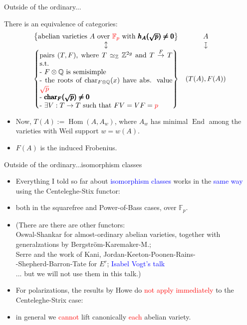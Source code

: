 \documentclass[usenames,dvipsnames,handout]{beamer}
\def\Q{\mathbb{Q}}
\def\Z{\mathbb{Z}}
\def\F{\mathbb{F}}
\DeclareMathOperator{\Char}{char}
\DeclareMathOperator{\Hom}{Hom}
\DeclareMathOperator{\End}{End}
\newcommand{\downmapsto}{\rotatebox[origin=c]{-90}{$\large\mapsto$}\mkern2mu} %
\newcommand{\set}[1]{\left\lbrace#1\right\rbrace }
\newcommand{\red}[1]{\textcolor{red}{#1}}
\newcommand{\blue}[1]{\textcolor{blue}{#1}}
\begin{document}
\begin{frame}{ Outside of the ordinary... }
\pause
	\begin{theorem}
	There is an equivalence of categories:
	\[ \begin{array}{cc}
	\set{\text{abelian varieties $A$ over \red{$\F_p$} with $\pmb{h_A(\sqrt{p})\neq 0}$}} 	& A \\
    \updownarrow											& \downmapsto \\
	\set{\parbox[p]{19em}{pairs $(T,F)$, where $T\simeq_\Z \Z^{2g}$ and $T\overset{F}{\to} T$ s.t.\\
	- $F\otimes \Q$ is semisimple\\
	- the roots of $\Char_{F\otimes\Q}(x)$ have abs. value \red{$\sqrt{p}$}\\
	- $\pmb{\Char_{F}(\sqrt{p})\neq 0}$\\
	- $\exists V:T\to T$ such that $FV=VF=\red{p}$
	}}	& (T(A),F(A))
	\end{array} \]
	\end{theorem}
\pause
	\begin{itemize}
	 \item Now, $T(A):=\Hom(A,A_w)$, where $A_w$ has minimal $\End$ among the varieties with Weil support $w=w(A)$.
	 \item $F(A)$ is the induced Frobenius.
	\end{itemize}
\end{frame}

\begin{frame}{ Outside of the ordinary...isomorphism classes } 
\begin{itemize}
    \item Everything I told so far about \blue{isomorphism classes} works in the \blue{same way} using the Centeleghe-Stix functor:
    \item both in the squarefree and Power-of-Bass cases, over $\F_p$.
\pause
    \item (There are there are other functors:\\
\pause
          Oswal-Shankar for almost-ordinary abelian varieties, together with generalzations by Bergstr\"om-Karemaker-M.;\\
\pause          
          Serre and the work of Kani, Jordan-Keeton-Poonen-Rains-\\-Shepherd-Barron-Tate for $E^r$; \blue{Isabel Vogt's talk}\\
\pause
    ... but we will not use them in this talk.)
\pause
    \item For polarizations, the results by Howe do \red{not apply immediately} to the Centeleghe-Strix case:
\pause
    \item in general we \red{cannot} lift canonically \red{each} abelian variety.
\end{itemize}
\end{frame}
\end{document}
